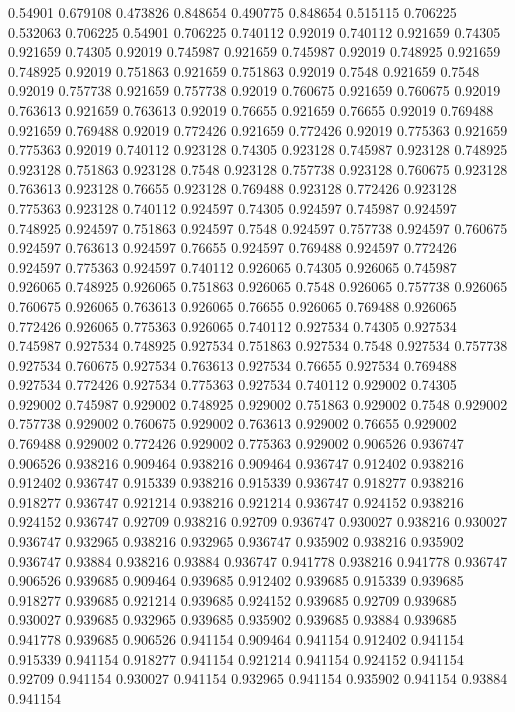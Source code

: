 0.54901 0.679108
0.473826 0.848654
0.490775 0.848654
0.515115 0.706225
0.532063 0.706225
0.54901 0.706225
0.740112 0.92019
0.740112 0.921659
0.74305 0.921659
0.74305 0.92019
0.745987 0.921659
0.745987 0.92019
0.748925 0.921659
0.748925 0.92019
0.751863 0.921659
0.751863 0.92019
0.7548 0.921659
0.7548 0.92019
0.757738 0.921659
0.757738 0.92019
0.760675 0.921659
0.760675 0.92019
0.763613 0.921659
0.763613 0.92019
0.76655 0.921659
0.76655 0.92019
0.769488 0.921659
0.769488 0.92019
0.772426 0.921659
0.772426 0.92019
0.775363 0.921659
0.775363 0.92019
0.740112 0.923128
0.74305 0.923128
0.745987 0.923128
0.748925 0.923128
0.751863 0.923128
0.7548 0.923128
0.757738 0.923128
0.760675 0.923128
0.763613 0.923128
0.76655 0.923128
0.769488 0.923128
0.772426 0.923128
0.775363 0.923128
0.740112 0.924597
0.74305 0.924597
0.745987 0.924597
0.748925 0.924597
0.751863 0.924597
0.7548 0.924597
0.757738 0.924597
0.760675 0.924597
0.763613 0.924597
0.76655 0.924597
0.769488 0.924597
0.772426 0.924597
0.775363 0.924597
0.740112 0.926065
0.74305 0.926065
0.745987 0.926065
0.748925 0.926065
0.751863 0.926065
0.7548 0.926065
0.757738 0.926065
0.760675 0.926065
0.763613 0.926065
0.76655 0.926065
0.769488 0.926065
0.772426 0.926065
0.775363 0.926065
0.740112 0.927534
0.74305 0.927534
0.745987 0.927534
0.748925 0.927534
0.751863 0.927534
0.7548 0.927534
0.757738 0.927534
0.760675 0.927534
0.763613 0.927534
0.76655 0.927534
0.769488 0.927534
0.772426 0.927534
0.775363 0.927534
0.740112 0.929002
0.74305 0.929002
0.745987 0.929002
0.748925 0.929002
0.751863 0.929002
0.7548 0.929002
0.757738 0.929002
0.760675 0.929002
0.763613 0.929002
0.76655 0.929002
0.769488 0.929002
0.772426 0.929002
0.775363 0.929002
0.906526 0.936747
0.906526 0.938216
0.909464 0.938216
0.909464 0.936747
0.912402 0.938216
0.912402 0.936747
0.915339 0.938216
0.915339 0.936747
0.918277 0.938216
0.918277 0.936747
0.921214 0.938216
0.921214 0.936747
0.924152 0.938216
0.924152 0.936747
0.92709 0.938216
0.92709 0.936747
0.930027 0.938216
0.930027 0.936747
0.932965 0.938216
0.932965 0.936747
0.935902 0.938216
0.935902 0.936747
0.93884 0.938216
0.93884 0.936747
0.941778 0.938216
0.941778 0.936747
0.906526 0.939685
0.909464 0.939685
0.912402 0.939685
0.915339 0.939685
0.918277 0.939685
0.921214 0.939685
0.924152 0.939685
0.92709 0.939685
0.930027 0.939685
0.932965 0.939685
0.935902 0.939685
0.93884 0.939685
0.941778 0.939685
0.906526 0.941154
0.909464 0.941154
0.912402 0.941154
0.915339 0.941154
0.918277 0.941154
0.921214 0.941154
0.924152 0.941154
0.92709 0.941154
0.930027 0.941154
0.932965 0.941154
0.935902 0.941154
0.93884 0.941154

